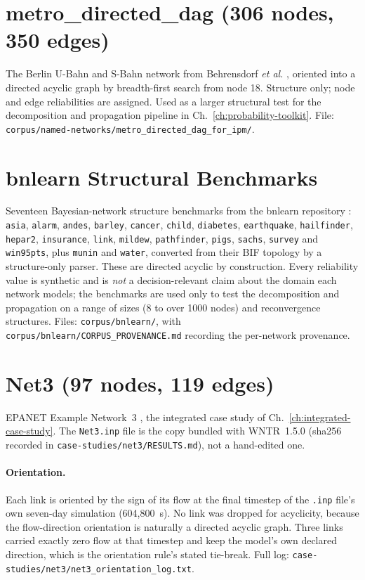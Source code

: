 \documentclass[12pt]{report}
\providecommand{\filepath}[1]{\nolinkurl{#1}}
\begin{document}
\section{metro\_directed\_dag (306 nodes, 350 edges)}
\label{sec:appA-metro}

The Berlin U-Bahn and S-Bahn network from Behrensdorf \emph{et al.}
\cite{behrensdorf2021numerically}, oriented into a directed acyclic graph by breadth-first
search from node 18. Structure only; node and edge reliabilities are assigned. Used as a
larger structural test for the decomposition and propagation pipeline in
Ch.~\ref{ch:probability-toolkit}. File:
\filepath{corpus/named-networks/metro\_directed\_dag\_for\_ipm/}.

\section{bnlearn Structural Benchmarks}
\label{sec:appA-bnlearn}

Seventeen Bayesian-network structure benchmarks from the bnlearn repository
\cite{scutari2010bnlearn}: \texttt{asia}, \texttt{alarm}, \texttt{andes},
\texttt{barley}, \texttt{cancer}, \texttt{child}, \texttt{diabetes}, \texttt{earthquake},
\texttt{hailfinder}, \texttt{hepar2}, \texttt{insurance}, \texttt{link}, \texttt{mildew},
\texttt{pathfinder}, \texttt{pigs}, \texttt{sachs}, \texttt{survey} and \texttt{win95pts},
plus \texttt{munin} and \texttt{water}, converted from their BIF topology by a
structure-only parser. These are directed acyclic by construction. Every reliability value
is synthetic and is \emph{not} a decision-relevant claim about the domain each network
models; the benchmarks are used only to test the decomposition and propagation on a range
of sizes (8 to over 1000 nodes) and reconvergence structures. Files:
\filepath{corpus/bnlearn/}, with \filepath{corpus/bnlearn/CORPUS\_PROVENANCE.md} recording the
per-network provenance.

\section{Net3 (97 nodes, 119 edges)}
\label{sec:appA-net3}

EPANET Example Network~3 \cite{rossman2000epanet2}, the integrated case study of
Ch.~\ref{ch:integrated-case-study}. The \filepath{Net3.inp} file is the copy bundled with
WNTR~1.5.0 (sha256 recorded in \filepath{case-studies/net3/RESULTS.md}), not a hand-edited
one.

\paragraph{Orientation.} Each link is oriented by the sign of its flow at the final
timestep of the \filepath{.inp} file's own seven-day simulation (604{,}800~s). No link was
dropped for acyclicity, because the flow-direction orientation is naturally a directed
acyclic graph. Three links carried exactly zero flow at that timestep and keep the model's own
declared direction, which is the orientation rule's stated tie-break. Full log:
\filepath{case-studies/net3/net3\_orientation\_log.txt}.
\end{document}
